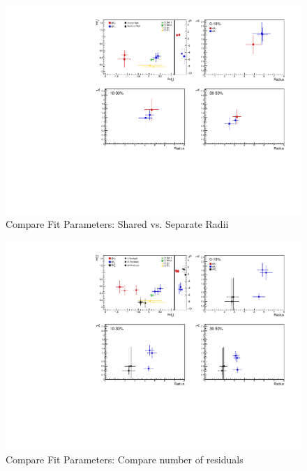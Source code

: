 \documentclass[../AnalysisNoteJBuxton.tex]{subfiles}
\begin{document}
\begin{figure}[h]
  \centering
  \includegraphics[width=\textwidth]{7_ResultsAndDiscussion/Figures/CompareAllScattParams_CompSharedvsSepR_StatOnly.pdf}
  \caption[Compare Fit Parameters: Shared vs. Separate Radii]{Compare Fit Parameters: Shared vs. Separate Radii}
  \label{fig:CompareAllScattParams_SharevsSepR}
\end{figure}

\begin{figure}[h]
  \centering
  \includegraphics[width=\textwidth]{7_ResultsAndDiscussion/Figures/CompareAllScattParams_CompNumRes_StatOnly.pdf}
  \caption[Compare Fit Parameters: Compare number of residuals]{Compare Fit Parameters: Compare number of residuals}
  \label{fig:CompareAllScattParams_CompNumRes}
\end{figure}

\clearpage
\end{document}
